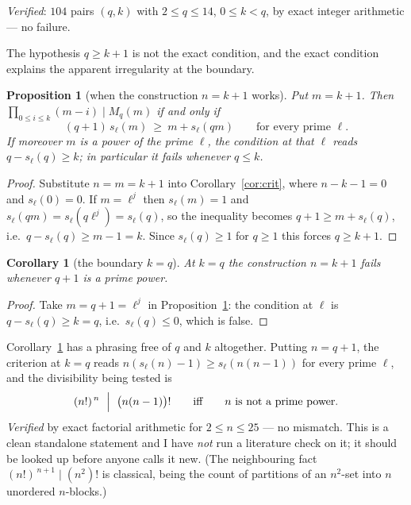 \documentclass[11pt]{article}
\newtheorem{corollary}[theorem]{Corollary}
\newtheorem{proposition}[theorem]{Proposition}
\begin{document}
\emph{Verified}: $104$ pairs $(q,k)$ with $2\le q\le14$, $0\le k<q$, by exact integer
arithmetic --- no failure.

The hypothesis $q\ge k+1$ is not the exact condition, and the exact condition explains the
apparent irregularity at the boundary.

\begin{proposition}[when the construction $n=k+1$ works]\label{prop:exact}
Put $m=k+1$.  Then $\prod_{0\le i\le k}(m-i)\mid M_q(m)$ if and only if
\[
  (q+1)\,s_\ell(m)\ \ge\ m+s_\ell(qm)\qquad\text{for every prime }\ell .
\]
If moreover $m$ is a power of the prime $\ell$, the condition at that $\ell$ reads
$q-s_\ell(q)\ge k$; in particular it fails whenever $q\le k$.
\end{proposition}

\begin{proof}
Substitute $n=m=k+1$ into Corollary~\ref{cor:crit}, where $n-k-1=0$ and $s_\ell(0)=0$.  If
$m=\ell^{j}$ then $s_\ell(m)=1$ and $s_\ell(qm)=s_\ell(q\ell^{j})=s_\ell(q)$, so the
inequality becomes $q+1\ge m+s_\ell(q)$, i.e.\ $q-s_\ell(q)\ge m-1=k$.  Since $s_\ell(q)\ge1$
for $q\ge1$ this forces $q\ge k+1$.
\end{proof}

\begin{corollary}[the boundary $k=q$]\label{cor:boundary}
At $k=q$ the construction $n=k+1$ fails whenever $q+1$ is a prime power.
\end{corollary}

\begin{proof}
Take $m=q+1=\ell^{j}$ in Proposition~\ref{prop:exact}: the condition at $\ell$ is
$q-s_\ell(q)\ge k=q$, i.e.\ $s_\ell(q)\le0$, which is false.
\end{proof}

Corollary~\ref{cor:boundary} has a phrasing free of $q$ and $k$ altogether.  Putting
$n=q+1$, the criterion at $k=q$ reads $n(s_\ell(n)-1)\ge s_\ell(n(n-1))$ for every prime
$\ell$, and the divisibility being tested is
\[
  (n!)^{\,n}\ \Bigm|\ \bigl(n(n-1)\bigr)! \qquad\text{iff}\qquad n\ \text{is not a prime power.}
\]
\emph{Verified} by exact factorial arithmetic for $2\le n\le25$ --- no mismatch.  This is a
clean standalone statement and I have \emph{not} run a literature check on it; it should be
looked up before anyone calls it new.  (The neighbouring fact $(n!)^{\,n+1}\mid(n^{2})!$ is
classical, being the count of partitions of an $n^{2}$-set into $n$ unordered $n$-blocks.)
\end{document}
